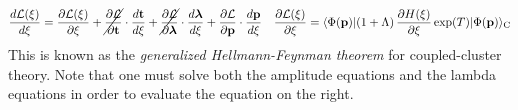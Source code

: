 \documentclass[11pt]{article}
\numberwithin{equation}{section}
\begin{document}
\begin{samepage}
\begin{rmk}
\begin{align}
  \fd{\mc{L}(\xi)}{\xi}
=
  \pd{\mc{L}(\xi)}{\xi}
+
  \cancel{
  \pd{\mc{L}}{\bo{t}}
  }
  \cdot
  \fd{\bo{t}}{\xi}
+
  \cancel{
  \pd{\mc{L}}{\bm{\la}}
  }
  \cdot
  \fd{\bm{\la}}{\xi}
+
  \pd{\mc{L}}{\bo{p}}
  \cdot
  \fd{\bo{p}}{\xi}
&&
  \pd{\mc{L}(\xi)}{\xi}
=
  \ip{\F(\bo{p})|
    (
      1
    +
      \La
    )\,
    \pd{H(\xi)}{\xi}\,
    \mr{exp}(T)
  |\F(\bo{p})}_\mr{C}
\end{align}
This is known as the \textit{generalized Hellmann-Feynman theorem} for coupled-cluster theory.
Note that one must solve both the amplitude equations and the lambda equations in order to evaluate the equation on the right.
\end{rmk}
\end{samepage}
\end{document}
